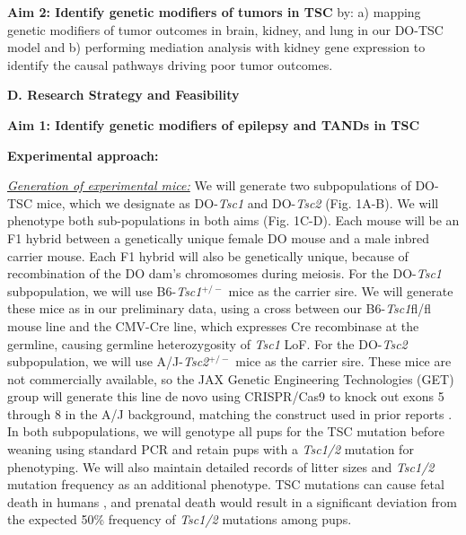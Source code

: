 \documentclass[
  12pt,
]{article}
\begin{document}
\textbf{Aim 2: Identify genetic modifiers of tumors in TSC} by: a)
mapping genetic modifiers of tumor outcomes in brain, kidney, and lung
in our DO-TSC model and b) performing mediation analysis with kidney
gene expression to identify the causal pathways driving poor tumor
outcomes.

\textbf{D. Research Strategy and Feasibility}

\textbf{Aim 1: Identify genetic modifiers of epilepsy and TANDs in TSC}

\textbf{Experimental approach:}

\textit{\underline{Generation of experimental mice:}} We will generate
two subpopulations of DO-TSC mice, which we designate as
DO-\textit{Tsc1} and DO-\textit{Tsc2} (Fig. 1A-B). We will phenotype
both sub-populations in both aims (Fig. 1C-D). Each mouse will be an F1
hybrid between a genetically unique female DO mouse and a male inbred
carrier mouse. Each F1 hybrid will also be genetically unique, because
of recombination of the DO dam's chromosomes during meiosis. For the
DO-\textit{Tsc1} subpopulation, we will use B6-\textit{Tsc1}\(^{+/-}\)
mice as the carrier sire. We will generate these mice as in our
preliminary data, using a cross between our B6-\textit{Tsc1}fl/fl mouse
line and the CMV-Cre line, which expresses Cre recombinase at the
germline, causing germline heterozygosity of \textit{Tsc1} LoF. For the
DO-\textit{Tsc2} subpopulation, we will use A/J-\textit{Tsc2}\(^{+/-}\)
mice as the carrier sire. These mice are not commercially available, so
the JAX Genetic Engineering Technologies (GET) group will generate this
line de novo using CRISPR/Cas9 to knock out exons 5 through 8 in the A/J
background, matching the construct used in prior reports
\cite{10491404, 20235887}. In both subpopulations, we will genotype all
pups for the TSC mutation before weaning using standard PCR and retain
pups with a \textit{Tsc1/2} mutation for phenotyping. We will also
maintain detailed records of litter sizes and \textit{Tsc1/2} mutation
frequency as an additional phenotype. TSC mutations can cause fetal
death in humans \cite{15731990, 28868251, 18236061}, and prenatal death
would result in a significant deviation from the expected 50\% frequency
of \textit{Tsc1/2} mutations among pups.
\end{document}
